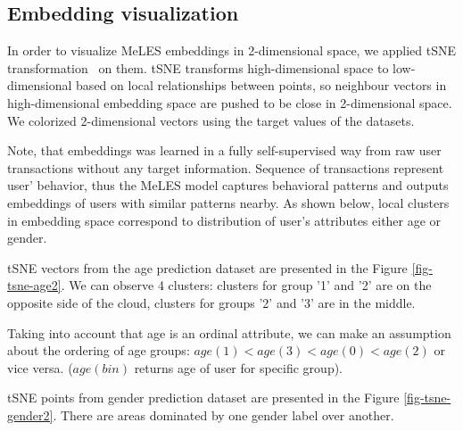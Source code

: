 \documentclass{article}
\begin{document}
\subsection{Embedding visualization} \label{app-sec-vis}

In order to visualize MeLES embeddings in 2-dimensional space, we applied tSNE transformation~\cite{Maaten2008VisualizingDU} on them. tSNE transforms high-dimensional space to low-dimensional based on local relationships between points, so neighbour vectors in high-dimensional embedding space are pushed to be close in 2-dimensional space. We colorized 2-dimensional vectors using the target values of the datasets.

Note, that embeddings was learned in a fully self-supervised way from raw user transactions without any target information. Sequence of transactions represent user' behavior, thus the MeLES model captures behavioral patterns and outputs embeddings of users with similar patterns nearby.
As shown below, local clusters in embedding space correspond to distribution of user's attributes either age or gender.

tSNE vectors from the age prediction dataset are presented in the Figure \ref{fig-tsne-age2}. We can observe 4 clusters: clusters for group '1' and '2' are on the opposite side of the cloud, clusters for groups '2' and '3' are in the middle.

Taking into account that age is an ordinal attribute, we can make an assumption about the ordering of age groups: $age(1) < age(3) < age(0) < age(2)$ or vice versa. ($age(bin)$ returns age of user for specific group).

tSNE points from gender prediction dataset are presented in the Figure \ref{fig-tsne-gender2}. There are areas dominated by one gender label over another.
\end{document}
